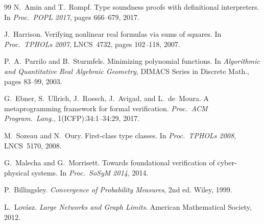 \documentclass{article}
\begin{document}
\begin{thebibliography}{99}
N.~Amin and T.~Rompf.
\newblock Type soundness proofs with definitional interpreters.
\newblock In \textit{Proc.\ POPL 2017}, pages 666--679, 2017.

J.~Harrison.
\newblock Verifying nonlinear real formulas via sums of squares.
\newblock In \textit{Proc.\ TPHOLs 2007}, LNCS~4732, pages 102--118, 2007.

P.~A.~Parrilo and B.~Sturmfels.
\newblock Minimizing polynomial functions.
\newblock In \textit{Algorithmic and Quantitative Real Algebraic Geometry},
  DIMACS Series in Discrete Math., pages 83--99, 2003.

G.~Ebner, S.~Ullrich, J.~Roesch, J.~Avigad, and L.~de~Moura.
\newblock A metaprogramming framework for formal verification.
\newblock \textit{Proc.\ ACM Program.\ Lang.}, 1(ICFP):34:1--34:29, 2017.

M.~Sozeau and N.~Oury.
\newblock First-class type classes.
\newblock In \textit{Proc.\ TPHOLs 2008}, LNCS~5170, 2008.

G.~Malecha and G.~Morrisett.
\newblock Towards foundational verification of cyber-physical systems.
\newblock In \textit{Proc.\ SoSyM 2014}, 2014.

P.~Billingsley.
\newblock \textit{Convergence of Probability Measures}, 2nd ed.
\newblock Wiley, 1999.

L.~Lov\'{a}sz.
\newblock \textit{Large Networks and Graph Limits}.
\newblock American Mathematical Society, 2012.

\end{thebibliography}
\end{document}
